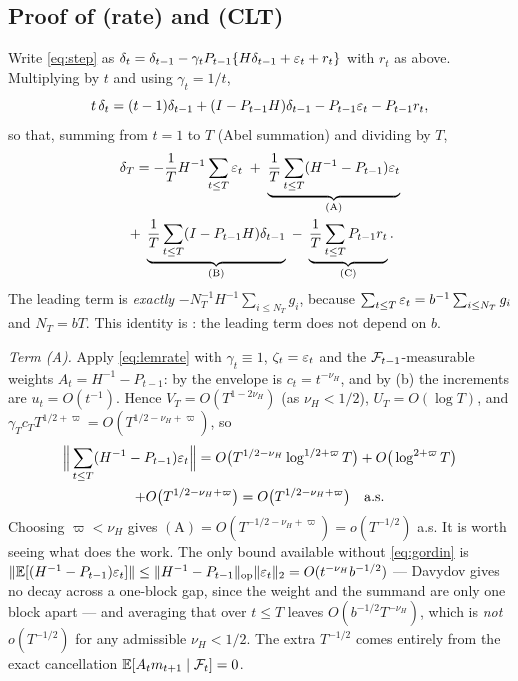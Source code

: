 \subsection{Proof of \texorpdfstring{}{the result} (rate) and
\texorpdfstring{}{Proposition 1 and Theorem 4} (CLT)}

Write \eqref{eq:step} as
$\delta_t=\delta_{t-1}-\gamma_tP_{t-1}\{H\delta_{t-1}+\varepsilon_t+r_t\}$ with $r_t$ as above.
Multiplying by $t$ and using $\gamma_t=1/t$,
\begin{equation}
t\,\delta_t=(t-1)\delta_{t-1}+(I-P_{t-1}H)\delta_{t-1}-P_{t-1}\varepsilon_t-P_{t-1}r_t ,
\label{eq:abel}
\end{equation}
so that, summing from $t=1$ to $T$ (Abel summation) and dividing by $T$,
\begin{multline}
\delta_T=-\frac1T H^{-1}\sum_{t\le T}\varepsilon_t
\;+\;\underbrace{\frac1T\sum_{t\le T}(H^{-1}-P_{t-1})\varepsilon_t}_{(\mathrm A)}\\
\;+\;\underbrace{\frac1T\sum_{t\le T}(I-P_{t-1}H)\delta_{t-1}}_{(\mathrm B)}
\;-\;\underbrace{\frac1T\sum_{t\le T}P_{t-1}r_t}_{(\mathrm C)} .
\label{eq:decomp}
\end{multline}
The leading term is \emph{exactly} $-N_T^{-1}H^{-1}\sum_{i\le N_T}g_i$, because
$\sum_{t\le T}\varepsilon_t=b^{-1}\sum_{i\le N_T}g_i$
and $N_T=bT$. This identity is : the leading term does not depend on
$b$.

\emph{Term (A).} Apply \eqref{eq:lemrate} with $\gamma_t\equiv1$, $\zeta_t=\varepsilon_t$ and the
$\mathcal{F}_{t-1}$-measurable weights $A_t=H^{-1}-P_{t-1}$: by  the envelope is
$c_t=t^{-\nu_H}$, and by (b) the increments are $u_t=O(t^{-1})$. Hence
$V_T=O(T^{1-2\nu_H})$ (as $\nu_H<1/2$), $U_T=O(\log T)$, and
$\gamma_Tc_TT^{1/2+\varpi}=O(T^{1/2-\nu_H+\varpi})$, so
\begin{multline*}
\Big\lVert\sum_{t\le T}(H^{-1}-P_{t-1})\varepsilon_t\Big\rVert
=O\big(T^{1/2-\nu_H}\log^{1/2+\varpi}T\big)+O\big(\log^{2+\varpi}T\big)\\
+O\big(T^{1/2-\nu_H+\varpi}\big)
=O\big(T^{1/2-\nu_H+\varpi}\big)\quad\text{a.s.}
\end{multline*}
Choosing $\varpi<\nu_H$ gives $(\mathrm A)=O(T^{-1/2-\nu_H+\varpi})=o(T^{-1/2})$ a.s.
It is worth seeing what does the work. The only bound available without \eqref{eq:gordin} is
$\lVert \mathbb{E}[(H^{-1}-P_{t-1})\varepsilon_t] \rVert\le\lVert H^{-1}-P_{t-1} \rVert_{\mathrm{op}}\lVert \varepsilon_t \rVert_2
=O(t^{-\nu_H}b^{-1/2})$ --- Davydov gives no decay across a one-block gap, since the weight
and the summand are only one block apart --- and averaging that over $t\le T$ leaves
$O(b^{-1/2}T^{-\nu_H})$, which is \emph{not} $o(T^{-1/2})$ for any admissible $\nu_H<1/2$.
The extra $T^{-1/2}$ comes entirely from the exact cancellation
$\mathbb{E}[A_tm_{t+1}\mid\mathcal{F}_t]=0$.

